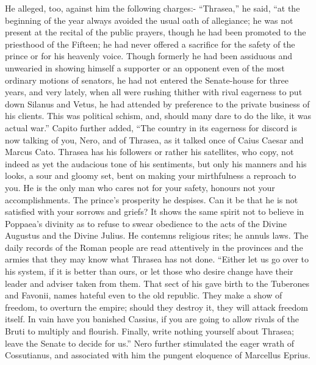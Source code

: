 He alleged, too, against him the following charges:- ``Thrasea,'' he said, ``at the beginning of the year always avoided the usual oath of allegiance; he was not present at the recital of the public prayers, though he had been promoted to the priesthood of the Fifteen; he had never offered a sacrifice for the safety of the prince or for his heavenly voice. Though formerly he had been assiduous and unwearied in showing himself a supporter or an opponent even of the most ordinary motions of senators, he had not entered the Senate-house for three years, and very lately, when all were rushing thither with rival eagerness to put down Silanus and Vetus, he had attended by preference to the private business of his clients. This was political schism, and, should many dare to do the like, it was actual war.'' Capito further added, ``The country in its eagerness for discord is now talking of you, Nero, and of Thrasea, as it talked once of Caius Caesar and Marcus Cato. Thrasea has his followers or rather his satellites, who copy, not indeed as yet the audacious tone of his sentiments, but only his manners and his looks, a sour and gloomy set, bent on making your mirthfulness a reproach to you. He is the only man who cares not for your safety, honours not your accomplishments. The prince's prosperity he despises. Can it be that he is not satisfied with your sorrows and griefs? It shows the same spirit not to believe in Poppaea's divinity as to refuse to swear obedience to the acts of the Divine Augustus and the Divine Julius. He contemns religious rites; he annuls laws. The daily records of the Roman people are read attentively in the provinces and the armies that they may know what Thrasea has not done. ``Either let us go over to his system, if it is better than ours, or let those who desire change have their leader and adviser taken from them. That sect of his gave birth to the Tuberones and Favonii, names hateful even to the old republic. They make a show of freedom, to overturn the empire; should they destroy it, they will attack freedom itself. In vain have you banished Cassius, if you are going to allow rivals of the Bruti to multiply and flourish. Finally, write nothing yourself about Thrasea; leave the Senate to decide for us.'' Nero further stimulated the eager wrath of Cossutianus, and associated with him the pungent eloquence of Marcellus Eprius.


